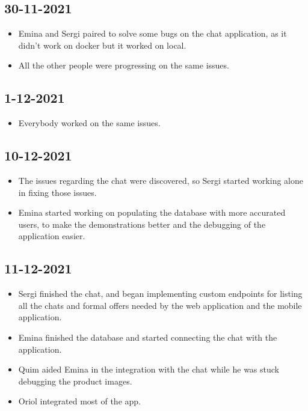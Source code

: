 \documentclass[./main.tex]{subfiles}
\begin{document}
\subsection{30-11-2021}
\begin{itemize}
	\item Emina and Sergi paired to solve some bugs on the chat application, as it didn't work
	on docker but it worked on local.
	\item All the other people were progressing on the same issues.
\end{itemize}

\subsection{1-12-2021}
\begin{itemize}
	\item Everybody worked on the same issues.
\end{itemize}


\subsection{10-12-2021}
\begin{itemize}
	\item The issues regarding the chat were discovered, so Sergi started working alone in fixing those issues.
	\item Emina started working on populating the database with more accurated users, to make the demonstrations better and the debugging of the application easier.
\end{itemize}

\subsection{11-12-2021}
\begin{itemize}
	\item Sergi finished the chat, and began implementing custom endpoints for listing all the chats and formal offers needed by the web application and the mobile application.
	\item Emina finished the database and started connecting the chat with the application.
	\item Quim aided Emina in the integration with the chat while he was stuck debugging the product images.
	\item Oriol integrated most of the app.
\end{itemize}
\end{document}
